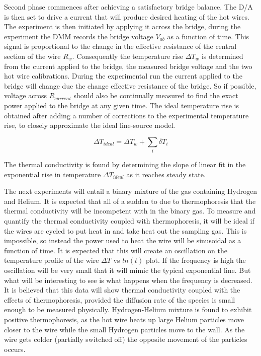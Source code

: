 \documentclass[12pt,MEng]{UoAThesis}
\begin{document}
Second phase commences after achieving a satisfactory bridge balance.  The D/A is then set to drive a current that will produce desired heating of the hot wires. The experiment is then initiated by applying it across the bridge, during the experiment the DMM records the bridge voltage $V_{ab}$ as a function of time. This signal is proportional to the change in the effective resistance of the central section of the wire $R_w$. Consequently the temperature rise $\Delta T_w$ is determined from the current applied to the bridge, the measured bridge voltage and the two hot wire calibrations. During the experimental run the current applied to the bridge will change due the change effective resistance of the bridge. So if possible, voltage across $R_{current}$ should also be continually measured to find the exact power applied to the bridge at any given time. The ideal temperature rise is obtained after adding a number of corrections to the experimental temperature rise, to closely approximate the ideal line-source model.

\begin{equation} \label{eq:correction}
\Delta T_{ideal} = \Delta T_w + \sum_{i} \delta T_i
\end{equation}

\noindent The thermal conductivity is found by determining the slope of linear fit in the exponential rise in temperature $\Delta T_{ideal}$ as it reaches steady state. 

The next experiments will entail a binary mixture of the gas containing Hydrogen and Helium. It is expected that all of a sudden to due to thermophoresis that the thermal conductivity will be incompetent with in the binary gas. To measure and quantify the thermal conductivity coupled with thermophoresis, it will be ideal if the wires are cycled to put heat in and take heat out the sampling gas. This is impossible, so instead the power used to heat the wire will be sinusoidal as a function of time. It is expected that this will create an oscillation on the temperature profile of the wire $\Delta T$ vs $ln(t)$ plot. If the frequency is high the oscillation will be very small that it will mimic the typical exponential line. But what will be interesting to see is what happens when the frequency is decreased. It is believed that this data will show thermal conductivity coupled with the effects of thermophoresis, provided the diffusion rate of the species is small enough to be measured physically. Hydrogen-Helium mixture is found to exhibit positive thermophoresis, as the hot wire heats up large Helium particles move closer to the wire while the small Hydrogen particles move to the wall. As the wire gets colder (partially switched off) the opposite movement of the particles occurs. 
\end{document}
